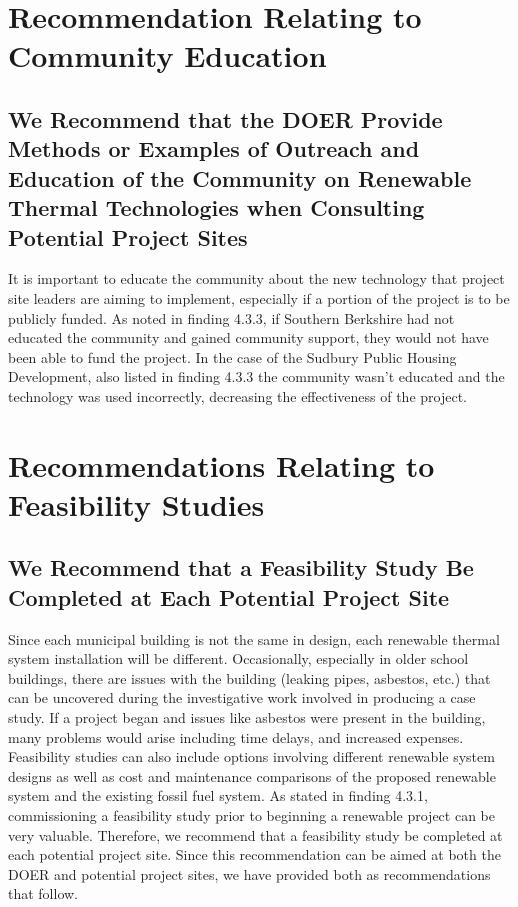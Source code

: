 \section{Recommendation Relating to Community Education} 
\subsection{We Recommend that the DOER Provide Methods or Examples of Outreach and Education of the Community on Renewable Thermal Technologies when Consulting Potential Project Sites}
It is important to educate the community about the new technology that project site leaders are aiming to implement, especially if a portion of the project is to be publicly funded. As noted in finding 4.3.3, if Southern Berkshire had not educated the community and gained community support, they would not have been able to fund the project. In the case of the Sudbury Public Housing Development, also listed in finding 4.3.3 the community wasn’t educated and the technology was used incorrectly, decreasing the effectiveness of the project. 

\section{Recommendations Relating to Feasibility Studies}
\subsection{We Recommend that a Feasibility Study Be Completed at Each Potential Project Site}
\par Since each municipal building is not the same in design, each renewable thermal system installation will be different. Occasionally, especially in older school buildings, there are issues with the building (leaking pipes, asbestos, etc.) that can be uncovered during the investigative work involved in producing a case study. If a project began and issues like asbestos were present in the building, many problems would arise including time delays, and increased expenses. Feasibility studies can also include options involving different renewable system designs as well as cost and maintenance comparisons of the proposed renewable system and the existing fossil fuel system. As stated in finding 4.3.1, commissioning a feasibility study prior to beginning a renewable project can be very valuable. Therefore, we recommend that a feasibility study be completed at each potential project site. Since this recommendation can be aimed at both the DOER and potential project sites, we have provided both as recommendations that follow.

